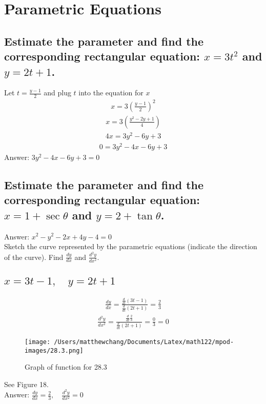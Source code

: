 \documentclass{article}
\begin{document}
\section{Parametric Equations}
\subsection{Estimate the parameter and find the corresponding rectangular equation: $x = 3t^2$ and $y = 2t + 1$.}
Let $t = \frac{y - 1}{2}$ and plug $t$ into the equation for $x$
\begin{align*}
	x = 3 \left( \frac{y - 1}{2} \right)^2
\end{align*}
\begin{align*}
	x = 3 \left( \frac{y^2 -2y + 1}{4} \right)
\end{align*}
\begin{align*}
	4x = 3y^2 - 6y + 3
\end{align*}
\begin{align*}
	0 = 3y^2 - 4x - 6y + 3
\end{align*}
Answer: $3y^2 - 4x - 6y + 3 = 0$

\subsection{Estimate the parameter and find the corresponding rectangular equation: $x = 1 + \sec{\theta}$ and $y = 2 + \tan{\theta}$.}
Answer: $x^2 - y^2 - 2x + 4y - 4 = 0$
\\[10pt]
Sketch the curve represented by the parametric equations (indicate the direction of the curve). Find $\frac{dy}{dx}$ and $\frac{d^2 y}{dx^2}$.
\subsection{$x = 3t - 1, \quad y = 2t + 1$}
\begin{align*}
	\frac{dy}{dx} = \frac{\frac{d}{dt}(3t - 1)}{\frac{d}{dt}(2t + 1)} = \frac{2}{3}
\end{align*}
\begin{align*}
	\frac{d^2 y}{dx^2} = \frac{\frac{d}{dt} \frac{2}{3}}{\frac{d}{dt}(2t + 1)} = \frac{0}{3} = 0
\end{align*}
\begin{figure}
	\centering
	\texttt{[image: /Users/matthewchang/Documents/Latex/math122/mpod-images/28.3.png]}
	\caption{Graph of function for 28.3}
\end{figure}
See Figure 18. \\[10pt]
Answer: $\frac{dy}{dx} = \frac{2}{3}, \quad \frac{d^2 y}{dx^2} = 0$
\end{document}
